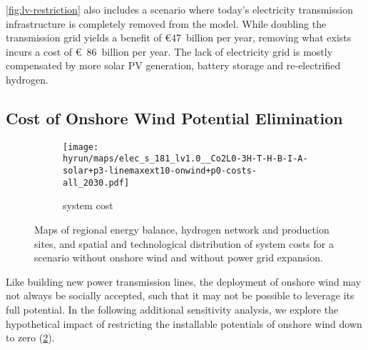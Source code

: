 \cref{fig:lv-restriction} also includes a scenario where today's electricity
transmission infrastructure is completely removed from the model. While doubling
the transmission grid yields a benefit of \euro47~billion per year, removing
what exists incurs a cost of \euro~86~billion per year. The lack of electricity
grid is mostly compensated by more solar PV generation, battery storage and
re-electrified hydrogen.

\subsection{Cost of Onshore Wind Potential Elimination}
\label{sec:si:onw}

\begin{figure}
    \centering
    \begin{subfigure}[t]{0.6\textwidth}
        \centering
        \caption{system cost}
        \texttt{[image: \\hyrun/maps/elec\_s\_181\_lv1.0\_\_Co2L0-3H-T-H-B-I-A-solar+p3-linemaxext10-onwind+p0-costs-all\_2030.pdf]}
        \label{fig:no-onw:tsc}
    \end{subfigure}
    \caption{Maps of regional energy balance, hydrogen network and production sites, and spatial and technological distribution of system costs for a scenario without onshore wind and without power grid expansion.}
    \label{fig:no-onw}
\end{figure}

Like building new power transmission lines, the deployment of onshore wind may
not always be socially accepted, such that it may not be possible to leverage
its full potential. In the following additional sensitivity analysis, we explore
the hypothetical impact of restricting the installable potentials of onshore
wind down to zero (\cref{fig:no-onw}).

